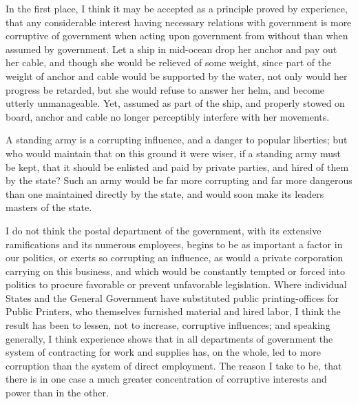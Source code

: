 \documentclass{book}
\begin{document}
In the first place, I think it may be accepted as a principle proved by experience, that any considerable interest having necessary relations with government is more corruptive of government when acting upon government from without than when assumed by government. Let a ship in mid-ocean drop her anchor and pay out her cable, and though she would be relieved of some weight, since part of the weight of anchor and cable would be supported by the water, not only would her progress be retarded, but she would refuse to answer her helm, and become utterly unmanageable. Yet, assumed as part of the ship, and properly stowed on board, anchor and cable no longer perceptibly interfere with her movements.

A standing army is a corrupting influence, and a danger to popular liberties; but who would maintain that on this ground it were wiser, if a standing army must be kept, that it should be enlisted and paid by private parties, and hired of them by the state? Such an army would be far more corrupting and far more dangerous than one maintained directly by the state, and would soon make its leaders masters of the state.

I do not think the postal department of the government, with its extensive ramifications and its numerous employees, begins to be as important a factor in our politics, or exerts so corrupting an influence, as would a private corporation carrying on this business, and which would be constantly tempted or forced into politics to procure favorable or prevent unfavorable legislation. Where individual States and the General Government have substituted public printing-offices for Public Printers, who themselves furnished material and hired labor, I think the result has been to lessen, not to increase, corruptive influences; and speaking generally, I think experience shows that in all departments of government the system of contracting for work and supplies has, on the whole, led to more corruption than the system of direct employment. The reason I take to be, that there is in one case a much greater concentration of corruptive interests and power than in the other.
\end{document}
